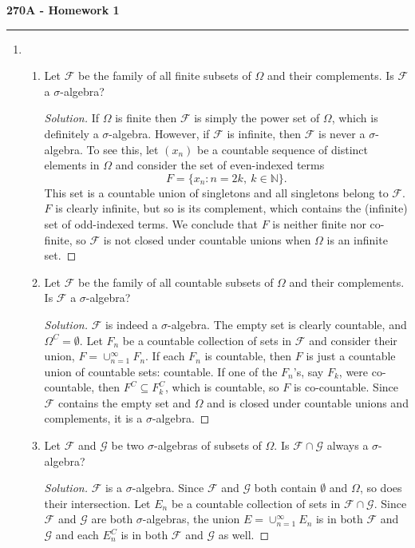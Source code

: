 \documentclass[11pt,letterpaper]{report}
\newcommand{\naturals}{\mathbb{N}}
\newcommand{\mcal}[1]{\mathcal{#1}}
\newenvironment{solution}
{\begin{proof}[Solution]}
{\end{proof}}
\begin{document}
\begin{center}
{\bf \Large 270A - Homework 1}
\vspace{0.2cm}
\hrule
\end{center}

\begin{enumerate}
	\item \begin{enumerate}
		\item Let $\mcal{F}$ be the family of all finite subsets of $\Omega$ and their complements. Is $\mcal{F}$ a $\sigma$-algebra?
		\begin{solution}
			If $\Omega$ is finite then $\mcal{F}$ is simply the power set of $\Omega$, which is definitely a $\sigma$-algebra. However, if $\mcal{F}$ is infinite, then $\mcal{F}$ is never a $\sigma$-algebra. To see this, let $(x_n)$ be a countable sequence of distinct elements in $\Omega$ and consider the set of even-indexed terms
			\[
				F = \{x_n: n = 2k,\ k\in \naturals\}.
			\]
			This set is a countable union of singletons and all singletons belong to $\mcal{F}$. $F$ is clearly infinite, but so is its complement, which contains the (infinite) set of odd-indexed terms. We conclude that $F$ is neither finite nor co-finite, so $\mcal{F}$ is not closed under countable unions when $\Omega$ is an infinite set.
		\end{solution}

		\item Let $\mcal{F}$ be the family of all countable subsets of $\Omega$ and their complements. Is $\mcal{F}$ a $\sigma$-algebra?
		\begin{solution}
			$\mcal{F}$ is indeed a $\sigma$-algebra. The empty set is clearly countable, and $\Omega^C = \emptyset$. Let $F_n$ be a countable collection of sets in $\mcal{F}$ and consider their union, $F = \cup_{n=1}^\infty F_n$. If each $F_n$ is countable, then $F$ is just a countable union of countable sets: countable. If one of the $F_n$'s, say $F_k$, were co-countable, then $F^C \subseteq F_k^C$, which is countable, so $F$ is co-countable. Since $\mcal{F}$ contains the empty set and $\Omega$ and is closed under countable unions and complements, it is a $\sigma$-algebra.
		\end{solution}

		\item Let $\mcal{F}$ and $\mcal{G}$ be two $\sigma$-algebras of subsets of $\Omega$. Is $\mcal{F}\cap \mcal{G}$ always a $\sigma$-algebra?
		\begin{solution}
			$\mcal{F}$ is a $\sigma$-algebra. Since $\mcal{F}$ and $\mcal{G}$ both contain $\emptyset$ and $\Omega$, so does their intersection. Let $E_n$ be a countable collection of sets in $\mcal{F}\cap \mcal{G}$. Since $\mcal{F}$ and $\mcal{G}$ are both $\sigma$-algebras, the union $E = \cup_{n=1}^\infty E_n$ is in both $\mcal{F}$ and $\mcal{G}$ and each $E_n^C$ is in both $\mcal{F}$ and $\mcal{G}$ as well.
		\end{solution}


\end{enumerate}
\end{enumerate}
\end{document}
